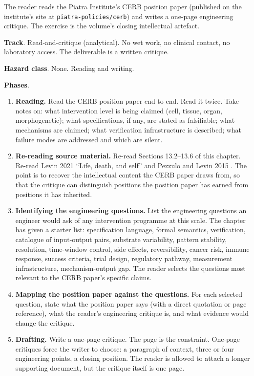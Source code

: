 \begin{project}

The reader reads the Piatra Institute's CERB position paper (published
on the institute's site at \texttt{piatra-policies/cerb}) and writes a
one-page engineering critique. The exercise is the volume's closing
intellectual artefact.

\textbf{Track}. Read-and-critique (analytical). No wet work, no
clinical contact, no laboratory access. The deliverable is a written
critique.

\textbf{Hazard class}. None. Reading and writing.

\textbf{Phases}.

\begin{enumerate}[leftmargin=*]
\item \textbf{Reading.} Read the CERB position paper end to end. Read
it twice. Take notes on: what intervention level is being claimed
(cell, tissue, organ, morphogenetic); what specifications, if any, are
stated as falsifiable; what mechanisms are claimed; what verification
infrastructure is described; what failure modes are addressed and
which are silent.
\item \textbf{Re-reading source material.} Re-read Sections 13.2--13.6
of this chapter. Re-read Levin 2021 ``Life, death, and self''
\cite{paper:v6c13-levin-life-death-2021} and Pezzulo and Levin 2015
\cite{paper:v6c13-pezzulo-levin-2015}. The point is to recover the
intellectual content the CERB paper draws from, so that the critique
can distinguish positions the position paper has earned from positions
it has inherited.
\item \textbf{Identifying the engineering questions.} List the
engineering questions an engineer would ask of any intervention
programme at this scale. The chapter has given a starter list:
specification language, formal semantics, verification, catalogue of
input-output pairs, substrate variability, pattern stability,
resolution, time-window control, side effects, reversibility, cancer
risk, immune response, success criteria, trial design, regulatory
pathway, measurement infrastructure, mechanism-output gap. The reader
selects the questions most relevant to the CERB paper's specific
claims.
\item \textbf{Mapping the position paper against the questions.} For
each selected question, state what the position paper says (with a
direct quotation or page reference), what the reader's engineering
critique is, and what evidence would change the critique.
\item \textbf{Drafting.} Write a one-page critique. The page is the
constraint. One-page critiques force the writer to choose: a paragraph
of context, three or four engineering points, a closing position. The
reader is allowed to attach a longer supporting document, but the
critique itself is one page.
\end{enumerate}


\end{project}
